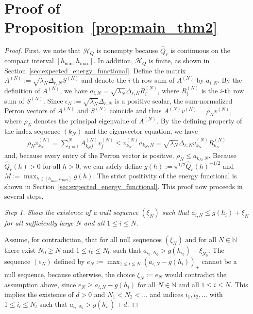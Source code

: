\section{Proof of Proposition~\ref{prop:main_thm2}}\label{sec:proof_main_thm2}

\begin{proof}
    First, we note that $\mathcal{H}_Q$ is nonempty because $\hat{Q}_r$ is continuous on the compact interval $[h_{\min},h_{\max}]$. In addition, $\mathcal{H}_Q$ is finite, as shown in Section~\ref{sec:expected_energy_functional}. Define the matrix $A^{(N)}:=\sqrt{\lambda_N}\Delta_{r,N}S^{(N)}$ and denote the $i$-th row sum of $A^{(N)}$ by $a_{i,N}$. By the definition of $A^{(N)}$, we have $a_{i,N}=\sqrt{\lambda_N}\Delta_{r,N}R_{i}^{(N)}$, where $R_{i}^{(N)}$ is the $i$-th row sum of $S^{(N)}$. Since $\epsilon_N:=\sqrt{\lambda_N}\Delta_{r,N}$ is a positive scalar, the sum-normalized Perron vectors of $A^{(N)}$ and $S^{(N)}$ coincide and thus $A^{(N)}v^{(N)}=\rho_Nv^{(N)}$, where $\rho_N$ denotes the principal eigenvalue of $A^{(N)}$. By the defining property of the index sequence $(k_N)$ and the eigenvector equation, we have
    \begin{align*}
        \rho_Nv_{k_N}^{(N)}=\sum_{j=1}^{N}A^{(N)}_{k_Nj}v_j^{(N)}\le v_{k_N}^{(N)}a_{k_N,N}=\sqrt{\lambda_N}\Delta_{r,N}v_{k_N}^{(N)}R_{k_N}^{(N)}
    \end{align*}
    and, because every entry of the Perron vector is positive, $\rho_N\le a_{k_N,N}$. Because $\hat{Q}_r(h)>0$ for all $h>0$, we can safely define $g(h):=\pi^{1/2}\hat{Q}_r(h)^{-1/2}$ and $M:=\max_{h\in[h_{\min},h_{\max}]}g(h)$. The strict positivity of the energy functional is shown in Section~\ref{sec:expected_energy_functional}. This proof now proceeds in several steps.

    \textit{Step 1. Show the existence of a null sequence $(\xi_N)$ such that $a_{i,N}\le g(h_i)+\xi_N$ for all sufficiently large $N$ and all $1\le i\le N$.}

    Assume, for contradiction, that for all null sequences $(\xi_N)$ and for all $N\in\mathbb{N}$ there exist $N_0\ge N$ and $1\le i_0\le N_0$ such that $a_{i_0,N_0}>g(h_{i_0})+\xi_{N_0}$. The sequence $(e_N)$ defined by $e_N:=\max_{1\le i\le N}(a_{i,N}-g(h_i))_{+}$ cannot be a null sequence, because otherwise, the choice $\xi_N:=e_N$ would contradict the assumption above, since $e_N\ge a_{i,N}-g(h_i)$ for all $N\in\mathbb{N}$ and all $1\le i\le N$. This implies the existence of $d>0$ and $N_1<N_2<\dots$ and indices $i_1,i_2,\dots$ with $1\le i_l\le N_l$ such that $a_{i_l,N_l}>g(h_{i_l})+d$. 


\end{proof}
